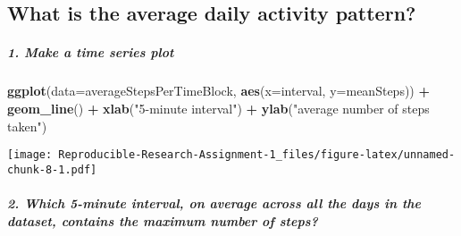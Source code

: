 \documentclass[]{article}
\newenvironment{Shaded}{\begin{snugshade}}{\end{snugshade}}
\newcommand{\CharTok}[1]{\textcolor[rgb]{0.31,0.60,0.02}{#1}}
\newcommand{\DataTypeTok}[1]{\textcolor[rgb]{0.13,0.29,0.53}{#1}}
\newcommand{\KeywordTok}[1]{\textcolor[rgb]{0.13,0.29,0.53}{\textbf{#1}}}
\newcommand{\NormalTok}[1]{#1}
\newcommand{\OperatorTok}[1]{\textcolor[rgb]{0.81,0.36,0.00}{\textbf{#1}}}
\newcommand{\OtherTok}[1]{\textcolor[rgb]{0.56,0.35,0.01}{#1}}
\newcommand{\StringTok}[1]{\textcolor[rgb]{0.31,0.60,0.02}{#1}}
\let\oldsubparagraph\subparagraph
\renewcommand{\subparagraph}[1]{\oldsubparagraph{#1}\mbox{}}
\begin{document}
\hypertarget{what-is-the-average-daily-activity-pattern}{%
\subsection{What is the average daily activity
pattern?}\label{what-is-the-average-daily-activity-pattern}}

\begin{Shaded}
\end{Shaded}

\hypertarget{make-a-time-series-plot}{%
\subparagraph{1. Make a time series
plot}\label{make-a-time-series-plot}}

\begin{Shaded}
\begin{Highlighting}[]
\KeywordTok{ggplot}\NormalTok{(}\DataTypeTok{data=}\NormalTok{averageStepsPerTimeBlock, }\KeywordTok{aes}\NormalTok{(}\DataTypeTok{x=}\NormalTok{interval, }\DataTypeTok{y=}\NormalTok{meanSteps)) }\OperatorTok{+}
\StringTok{    }\KeywordTok{geom_line}\NormalTok{() }\OperatorTok{+}
\StringTok{    }\KeywordTok{xlab}\NormalTok{(}\StringTok{"5-minute interval"}\NormalTok{) }\OperatorTok{+}
\StringTok{    }\KeywordTok{ylab}\NormalTok{(}\StringTok{"average number of steps taken"}\NormalTok{) }
\end{Highlighting}
\end{Shaded}

\texttt{[image: Reproducible-Research-Assignment-1\_files/figure-latex/unnamed-chunk-8-1.pdf]}

\hypertarget{which-5-minute-interval-on-average-across-all-the-days-in-the-dataset-contains-the-maximum-number-of-steps}{%
\subparagraph{2. Which 5-minute interval, on average across all the days
in the dataset, contains the maximum number of
steps?}\label{which-5-minute-interval-on-average-across-all-the-days-in-the-dataset-contains-the-maximum-number-of-steps}}

\begin{Shaded}
\end{Shaded}
\end{document}
